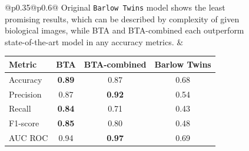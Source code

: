 \documentclass{article}
\begin{document}
\begin{figure}[htbp]
    \noindent\begin{tabular}{@{}p{}@{\hspace{6mm}}p{}@{}}
        Original \texttt{Barlow Twins} model shows the least promising results, 
        which can be described by complexity of given biological images,
        while BTA and BTA-combined each outperform state-of-the-art model in any 
        accuracy metrics. 
        &
        \centering
        \begin{tabular}[t]{lccc}
            \hline
            Metric & BTA & BTA-combined & Barlow Twins \\
            \hline
            Accuracy & \textbf{0.89} & 0.87 & 0.68 \\
            Precision & 0.87 & \textbf{0.92} & 0.54 \\
            Recall & \textbf{0.84} & 0.71 & 0.43 \\
            F1-score & \textbf{0.85} & 0.80 & 0.48 \\
            AUC ROC & 0.94 & \textbf{0.97} & 0.69 \\
            \hline
        \end{tabular}
    \end{tabular}
    
    \vspace{5mm}
    

\end{figure}
\end{document}
